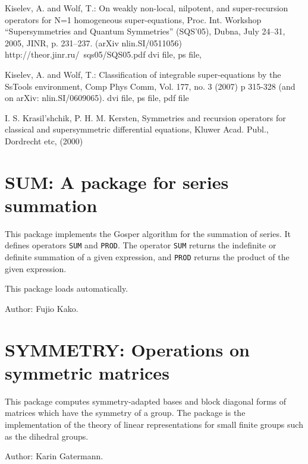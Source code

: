 \begin{cbunit}
\begin{thebibliography}{99}
Kiselev, A. and Wolf, T.: On weakly non-local, nilpotent, and super-recursion
operators for N=1 homogeneous super-equations, Proc. Int. Workshop
``Supersymmetries and Quantum Symmetries'' (SQS'05), Dubna, July 24--31, 2005,
JINR, p. 231--237. (arXiv nlin.SI/0511056)
http://theor.jinr.ru/~sqs05/SQS05.pdf dvi file, ps file,

Kiselev, A. and Wolf, T.: Classification of integrable super-equations by the
SsTools environment, Comp Phys Comm, Vol. 177, no. 3 (2007) p 315-328 (and on
arXiv: nlin.SI/0609065). dvi file, ps file, pdf file

I. S. Krasil'shchik, P. H. M. Kersten, Symmetries and recursion operators for
classical and supersymmetric differential equations, Kluwer Acad. Publ.,
Dordrecht etc, (2000) 

\end{thebibliography}

\end{cbunit}


\newpage

\section{SUM: A package for series summation} 
\hypertarget{operator:SUM}{}
\hypertarget{operator:PROD}{}

This package implements the Gosper algorithm for the summation of series.
It defines operators {\tt SUM} and {\tt PROD}.  The operator {\tt SUM}
returns the indefinite or definite summation of a given expression, and
{\tt PROD} returns the product of the given expression.

This package loads automatically.

Author: Fujio Kako.


\newpage

\section{SYMMETRY: Operations on symmetric matrices} 

This package computes symmetry-adapted bases and block diagonal forms of
matrices which have the symmetry of a group.  The package is the
implementation of the theory of linear representations for small finite
groups such as the dihedral groups.

Author: Karin Gatermann.

